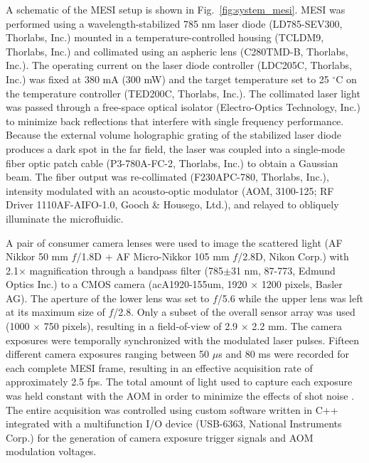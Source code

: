 \documentclass[12pt]{spieman}
\begin{document}
\begin{spacing}{2}
A schematic of the MESI setup is shown in Fig.~\ref{fig:system_mesi}. MESI was performed using a wavelength-stabilized 785 nm laser diode (LD785-SEV300, Thorlabs, Inc.) mounted in a temperature-controlled housing (TCLDM9, Thorlabs, Inc.) and collimated using an aspheric lens (C280TMD-B, Thorlabs, Inc.). The operating current on the laser diode controller (LDC205C, Thorlabs, Inc.) was fixed at 380 mA (300 mW) and the target temperature set to 25 $^\circ$C on the temperature controller (TED200C, Thorlabs, Inc.). The collimated laser light was passed through a free-space optical isolator (Electro-Optics Technology, Inc.) to minimize back reflections that interfere with single frequency performance. Because the external volume holographic grating of the stabilized laser diode produces a dark spot in the far field, the laser was coupled into a single-mode fiber optic patch cable (P3-780A-FC-2, Thorlabs, Inc.) to obtain a Gaussian beam. The fiber output was re-collimated (F230APC-780, Thorlabs, Inc.), intensity modulated with an acousto-optic modulator (AOM, 3100-125; RF Driver 1110AF-AIFO-1.0, Gooch \& Housego, Ltd.), and relayed to obliquely illuminate the microfluidic.

A pair of consumer camera lenses were used to image the scattered light (AF Nikkor 50 mm $f$/1.8D + AF Micro-Nikkor 105 mm $f$/2.8D, Nikon Corp.) with 2.1$\times$ magnification through a bandpass filter (785$\pm$31 nm, 87-773, Edmund Optics Inc.) to a CMOS camera (acA1920-155um, 1920 $\times$ 1200 pixels, Basler AG). The aperture of the lower lens was set to $f$/5.6 while the upper lens was left at its maximum size of $f$/2.8. Only a subset of the overall sensor array was used (1000 $\times$ 750 pixels), resulting in a field-of-view of 2.9 $\times$ 2.2 mm. The camera exposures were temporally synchronized with the modulated laser pulses. Fifteen different camera exposures ranging between 50 $\mu$s and 80 ms were recorded for each complete MESI frame, resulting in an effective acquisition rate of approximately 2.5 fps. The total amount of light used to capture each exposure was held constant with the AOM in order to minimize the effects of shot noise \cite{Parthasarathy:2008el}. The entire acquisition was controlled using custom software written in C++ integrated with a multifunction I/O device (USB-6363, National Instruments Corp.) for the generation of camera exposure trigger signals and AOM modulation voltages.


\end{spacing}
\end{document}

